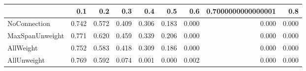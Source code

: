 \begin{tabular}{lrrrrrrrr}
\toprule
{} &   0.1 &   0.2 &   0.3 &   0.4 &   0.5 &   0.6 & 0.7000000000000001 &   0.8 \\
\midrule
NoConnection    & 0.742 & 0.572 & 0.409 & 0.306 & 0.183 & 0.000 &              0.000 & 0.000 \\
MaxSpanUnweight & 0.771 & 0.620 & 0.459 & 0.339 & 0.206 & 0.000 &              0.000 & 0.000 \\
AllWeight       & 0.752 & 0.583 & 0.418 & 0.309 & 0.186 & 0.000 &              0.000 & 0.000 \\
AllUnweight     & 0.769 & 0.592 & 0.074 & 0.001 & 0.000 & 0.002 &              0.000 & 0.000 \\
\bottomrule
\end{tabular}
